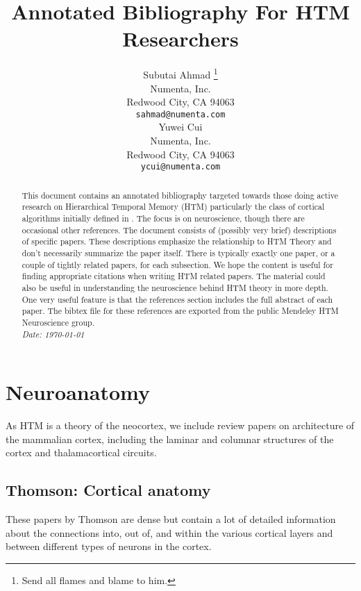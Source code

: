 \documentclass{article} %
\title{Annotated Bibliography For HTM Researchers}
\author{
Subutai Ahmad \thanks{Send all flames and blame to him.} \\
Numenta, Inc.\\
Redwood City, CA 94063 \\
\texttt{sahmad@numenta.com} \\
\And
Yuwei Cui \\
Numenta, Inc.\\
Redwood City, CA 94063 \\
\texttt{ycui@numenta.com} \\
}
\begin{document}
\maketitle

\begin{abstract}
This document contains an annotated bibliography targeted towards those doing
active research on Hierarchical Temporal Memory (HTM) particularly the class of 
cortical algorithms initially defined in \cite{Hawkins2011}. The focus is on
neuroscience, though there are occasional other references. The document consists
of (possibly very brief) descriptions of specific papers. These descriptions
emphasize the relationship to HTM Theory and don't necessarily summarize the
paper itself. There is typically exactly one paper, or a couple of tightly
related papers, for each subsection. We hope the content is useful for finding
appropriate citations when writing HTM related papers. The material
could also be useful in understanding the neuroscience behind HTM theory in more
depth. One very useful feature is that the references section includes the full
abstract of each paper. The bibtex file for these references are exported from
the public Mendeley HTM Neuroscience group.
 \\

\emph{Date: \today}
\end{abstract}

\clearpage


\renewcommand{\contentsname}{Table of Contents}
\setcounter{tocdepth}{2}
\tableofcontents

\clearpage

\section{Neuroanatomy}

As HTM is a theory of the neocortex, we include review papers on architecture
of the mammalian cortex, including the laminar and columnar structures of the
cortex and thalamacortical circuits.

\subsection{Thomson: Cortical anatomy}

These papers by Thomson \cite{Thomson2003,Thomson2007,Thomson2010} are dense
but contain a lot of detailed information about the connections into, out of,
and within the various cortical layers and between different types of neurons in the cortex.
\end{document}
